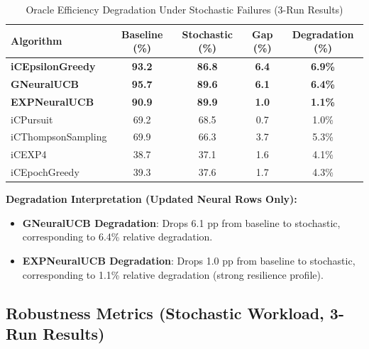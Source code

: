 \documentclass[12pt,a4paper]{article}
\newcommand{\primarytext}[1]{\textcolor{primaryblue}{\textbf{#1}}}
\newcommand{\legacy}[1]{\textcolor{legacycolor}{\textbf{#1}}}
\newcommand{\neural}[1]{\textcolor{neuralcolor}{\textbf{#1}}}
\begin{document}
\begin{table}[H]
\centering
\caption{Oracle Efficiency Degradation Under Stochastic Failures (3-Run Results)}
\label{tab:degradation-analysis}
\begin{tabular}{@{}lcccc@{}}
\toprule
\textbf{Algorithm} & \textbf{Baseline (\%)} & \textbf{Stochastic (\%)} & \textbf{Gap (\%)} & \textbf{Degradation (\%)} \\
\midrule
\primarytext{iCEpsilonGreedy}   & \primarytext{93.2} & \primarytext{86.8} & \primarytext{6.4} & \primarytext{6.9\%} \\
\neural{GNeuralUCB}            & \neural{95.7} & \neural{89.6} & \neural{6.1} & \neural{6.4\%} \\
\legacy{EXPNeuralUCB}           & \legacy{90.9} & \legacy{89.9} & \legacy{1.0} & \legacy{1.1\%} \\
iCPursuit                       & 69.2 & 68.5 & 0.7 & 1.0\% \\
iCThompsonSampling              & 69.9 & 66.3 & 3.7 & 5.3\% \\
iCEXP4                          & 38.7 & 37.1 & 1.6 & 4.1\% \\
iCEpochGreedy                   & 39.3 & 37.6 & 1.7 & 4.3\% \\
\bottomrule
\end{tabular}
\end{table}

\textbf{Degradation Interpretation (Updated Neural Rows Only):}
\begin{itemize}
\item \neural{GNeuralUCB Degradation}: Drops 6.1 pp from baseline to stochastic, corresponding to 6.4\% relative degradation.
\item \legacy{EXPNeuralUCB Degradation}: Drops 1.0 pp from baseline to stochastic, corresponding to 1.1\% relative degradation (strong resilience profile).
\end{itemize}

\subsection{Robustness Metrics (Stochastic Workload, 3-Run Results)}
\end{document}
